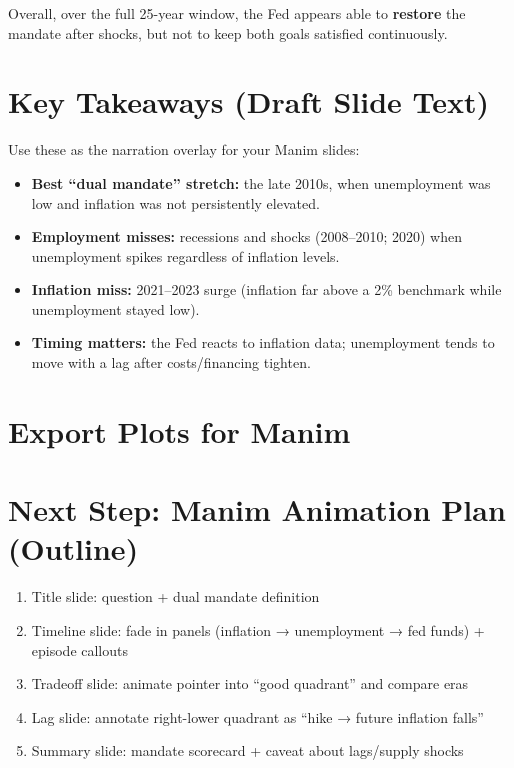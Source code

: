 \documentclass[
  11pt,
]{article}
\providecommand{\tightlist}{%
  \setlength{\itemsep}{0pt}\setlength{\parskip}{0pt}}
\begin{document}
Overall, over the full 25-year window, the Fed appears able to
\textbf{restore} the mandate after shocks, but not to keep both goals
satisfied continuously.

\section{Key Takeaways (Draft Slide
Text)}\label{key-takeaways-draft-slide-text}

Use these as the narration overlay for your Manim slides:

\begin{itemize}
\tightlist
\item
  \textbf{Best ``dual mandate'' stretch:} the late 2010s, when
  unemployment was low and inflation was not persistently elevated.\\
\item
  \textbf{Employment misses:} recessions and shocks (2008--2010; 2020)
  when unemployment spikes regardless of inflation levels.\\
\item
  \textbf{Inflation miss:} 2021--2023 surge (inflation far above a 2\%
  benchmark while unemployment stayed low).\\
\item
  \textbf{Timing matters:} the Fed reacts to inflation data;
  unemployment tends to move with a lag after costs/financing tighten.
\end{itemize}

\section{Export Plots for Manim}\label{export-plots-for-manim}

\section{Next Step: Manim Animation Plan
(Outline)}\label{next-step-manim-animation-plan-outline}

\begin{enumerate}
\def\labelenumi{\arabic{enumi}.}
\tightlist
\item
  Title slide: question + dual mandate definition\\
\item
  Timeline slide: fade in panels (inflation → unemployment → fed funds)
  + episode callouts\\
\item
  Tradeoff slide: animate pointer into ``good quadrant'' and compare
  eras\\
\item
  Lag slide: annotate right-lower quadrant as ``hike → future inflation
  falls''\\
\item
  Summary slide: mandate scorecard + caveat about lags/supply shocks
\end{enumerate}
\end{document}

